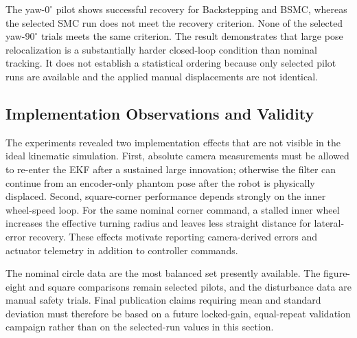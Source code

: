 The yaw-$0^\circ$ pilot shows successful recovery for Backstepping and BSMC,
whereas the selected SMC run does not meet the recovery criterion. None of
the selected yaw-$90^\circ$ trials meets the same criterion. The result
demonstrates that large pose relocalization is a substantially harder
closed-loop condition than nominal tracking. It does not establish a
statistical ordering because only selected pilot runs are available and the
applied manual displacements are not identical.

\subsection{Implementation Observations and Validity}

The experiments revealed two implementation effects that are not visible in
the ideal kinematic simulation. First, absolute camera measurements must be
allowed to re-enter the EKF after a sustained large innovation; otherwise the
filter can continue from an encoder-only phantom pose after the robot is
physically displaced. Second, square-corner performance depends strongly on
the inner wheel-speed loop. For the same nominal corner command, a stalled
inner wheel increases the effective turning radius and leaves less straight
distance for lateral-error recovery. These effects motivate reporting
camera-derived errors and actuator telemetry in addition to controller
commands.

The nominal circle data are the most balanced set presently available. The
figure-eight and square comparisons remain selected pilots, and the
disturbance data are manual safety trials. Final publication claims requiring
mean and standard deviation must therefore be based on a future locked-gain,
equal-repeat validation campaign rather than on the selected-run values in
this section.

\FloatBarrier
